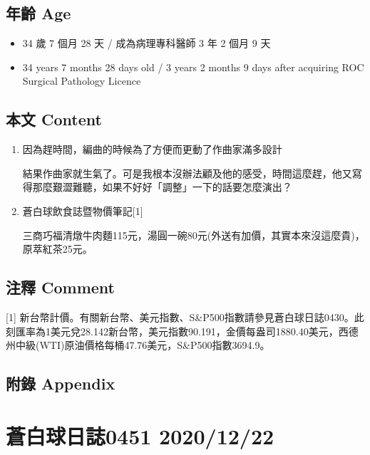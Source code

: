 \documentclass[
]{article}
\providecommand{\tightlist}{%
  \setlength{\itemsep}{0pt}\setlength{\parskip}{0pt}}
\begin{document}
\hypertarget{ux5e74ux9f61-age-20}{%
\subsection{年齡 Age}\label{ux5e74ux9f61-age-20}}

\begin{itemize}
\tightlist
\item
  34 歲 7 個月 28 天 / 成為病理專科醫師 3 年 2 個月 9 天
\item
  34 years 7 months 28 days old / 3 years 2 months 9 days after
  acquiring ROC Surgical Pathology Licence
\end{itemize}

\hypertarget{ux672cux6587-content-20}{%
\subsection{本文 Content}\label{ux672cux6587-content-20}}

\begin{enumerate}
\def\labelenumi{\arabic{enumi}.}
\item
  因為趕時間，編曲的時候為了方便而更動了作曲家滿多設計

  結果作曲家就生氣了。可是我根本沒辦法顧及他的感受，時間這麼趕，他又寫得那麼艱澀難聽，如果不好好「調整」一下的話要怎麼演出？
\item
  蒼白球飲食誌暨物價筆記{[}1{]}

  三商巧福清燉牛肉麵115元，湯圓一碗80元(外送有加價，其實本來沒這麼貴)，原萃紅茶25元。
\end{enumerate}

\hypertarget{ux6ce8ux91cb-comment-20}{%
\subsection{注釋 Comment}\label{ux6ce8ux91cb-comment-20}}

{[}1{]}
新台幣計價。有關新台幣、美元指數、S\&P500指數請參見蒼白球日誌0430。此刻匯率為1美元兌28.142新台幣，美元指數90.191，金價每盎司1880.40美元，西德州中級(WTI)原油價格每桶47.76美元，S\&P500指數3694.9。

\hypertarget{ux9644ux9304-appendix-20}{%
\subsection{附錄 Appendix}\label{ux9644ux9304-appendix-20}}

\hypertarget{ux84bcux767dux7403ux65e5ux8a8c0451-20201222}{%
\section{蒼白球日誌0451
2020/12/22}\label{ux84bcux767dux7403ux65e5ux8a8c0451-20201222}}
\end{document}
